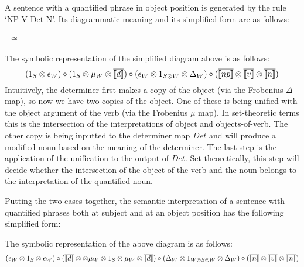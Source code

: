 A sentence with a  quantified phrase in  object position is generated by the rule   `NP V Det N'. Its diagrammatic meaning   and its simplified form are as follows:



\begin{minipage}{20cm}
\begin{minipage}{7cm}
\end{minipage}
\ $\cong$ \ \qquad
\begin{minipage}{5cm}
\end{minipage}
\end{minipage}


\noindent
The symbolic representation of the simplified  diagram above is as follows:
\[
(1_S \otimes \epsilon_W) \circ (1_S \otimes \mu_W \otimes \overline{\semantics{d}}) \circ (\epsilon_W \otimes 1_{S \otimes W} \otimes \Delta_W) \circ (\overline{\semantics{np}} \otimes \overline{\semantics{v}} \otimes \overline{\semantics{n}})
\]
Intuitively,   the determiner first makes a copy of the object (via the Frobenius $\Delta$ map), so now we have two copies of the object. One of these is being unified with the object argument of the verb (via the Frobenius $\mu$ map). In set-theoretic terms this is the intersection of the interpretations of object and objects-of-verb. The other copy is being inputted to the determiner map $Det$ and will produce a modified noun based on the meaning of the determiner.  The last step is the application of the unification to the output of $Det$. Set theoretically, this step will decide whether the intersection of the object of the verb and the noun belongs to the interpretation of the quantified noun. 


Putting the two cases together, the semantic interpretation  of a sentence with  quantified phrases both at subject and at an object position  has the following simplified form:


\begin{center}
\begin{minipage}{7cm}
\end{minipage}
\end{center}

\noindent
The symbolic representation of the above diagram is as follows:
\[{\small
(\epsilon_W \otimes 1_S \otimes \epsilon_W) \circ (\overline{\semantics{d}} \otimes  \otimes \mu_W \otimes 1_S \otimes \mu_W \otimes \overline{\semantics{d}}) \circ (\Delta_W \otimes 1_{W \otimes S \otimes W} \otimes \Delta_W)} \circ (\overline{\semantics{n}} \otimes \overline{\semantics{v}} \otimes \overline{\semantics{n}})
\]


